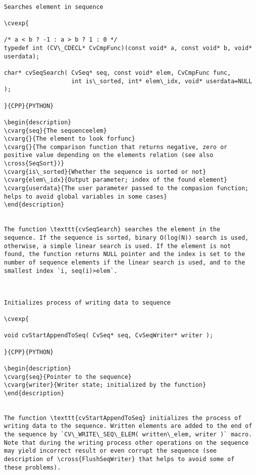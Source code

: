 \begin{verbatim}

Searches element in sequence

\cvexp{

/* a < b ? -1 : a > b ? 1 : 0 */
typedef int (CV\_CDECL* CvCmpFunc)(const void* a, const void* b, void* userdata);

char* cvSeqSearch( CvSeq* seq, const void* elem, CvCmpFunc func,
                   int is\_sorted, int* elem\_idx, void* userdata=NULL );

}{CPP}{PYTHON}

\begin{description}
\cvarg{seq}{The sequenceelem}
\cvarg{}{The element to look forfunc}
\cvarg{}{The comparison function that returns negative, zero or positive value depending on the elements relation (see also \cross{SeqSort})}
\cvarg{is\_sorted}{Whether the sequence is sorted or not}
\cvarg{elem\_idx}{Output parameter; index of the found element}
\cvarg{userdata}{The user parameter passed to the compasion function; helps to avoid global variables in some cases}
\end{description}


The function \texttt{cvSeqSearch} searches the element in the sequence. If the sequence is sorted, binary O(log(N)) search is used, otherwise, a simple linear search is used. If the element is not found, the function returns NULL pointer and the index is set to the number of sequence elements if the linear search is used, and to the smallest index `i, seq(i)>elem`.


\end{verbatim}
\begin{verbatim}

Initializes process of writing data to sequence

\cvexp{

void cvStartAppendToSeq( CvSeq* seq, CvSeqWriter* writer );

}{CPP}{PYTHON}

\begin{description}
\cvarg{seq}{Pointer to the sequence}
\cvarg{writer}{Writer state; initialized by the function}
\end{description}


The function \texttt{cvStartAppendToSeq} initializes the process of writing data to the sequence. Written elements are added to the end of the sequence by `CV\_WRITE\_SEQ\_ELEM( written\_elem, writer )` macro. Note that during the writing process other operations on the sequence may yield incorrect result or even corrupt the sequence (see description of \cross{FlushSeqWriter} that helps to avoid some of these problems).


\end{verbatim}
